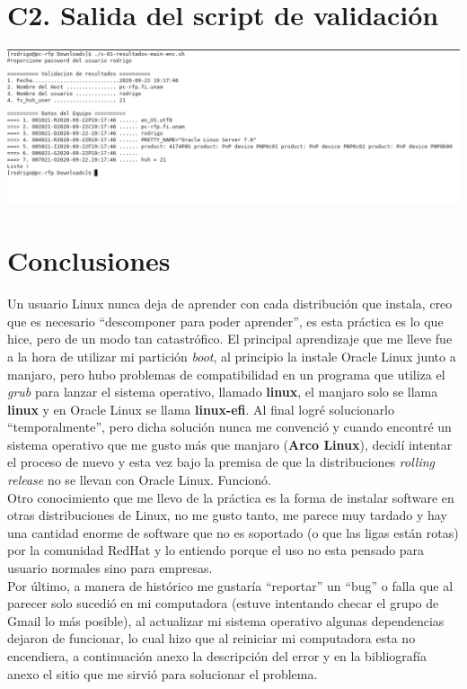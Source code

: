 \documentclass{article}
\begin{document}
\section*{C2. Salida del script de validación}

\begin{center}
    \includegraphics[width=\linewidth]{p01-validador.png}    
\end{center}

\section*{Conclusiones}
Un usuario Linux nunca deja de aprender con cada distribución que instala, 
creo que es necesario ``descomponer para poder aprender'', es esta práctica es 
lo que hice, pero de un modo tan catastrófico. El principal aprendizaje que me 
lleve fue a la hora de utilizar mi partición \textit{boot}, al principio la
instale Oracle Linux junto a manjaro, pero hubo problemas de compatibilidad 
en un programa que utiliza el \textit{grub} para lanzar el sistema operativo,
llamado \textbf{linux}, el manjaro solo se llama \textbf{linux} y en Oracle 
Linux se llama \textbf{linux-efi}. Al final logré solucionarlo 
``temporalmente'', pero dicha solución nunca me convenció y cuando encontré un 
sistema operativo que me gusto más que manjaro (\textbf{Arco Linux}), decidí
intentar el proceso de nuevo y esta vez bajo la premisa de que la distribuciones
\textit{rolling release} no se llevan con Oracle Linux. Funcionó.\\

Otro conocimiento que me llevo de la práctica es la forma de instalar software 
en otras distribuciones de Linux, no me gusto tanto, me parece muy tardado y 
hay una cantidad enorme de software que no es soportado (o que las ligas están
rotas) por la comunidad RedHat y lo entiendo porque el uso no esta pensado para
usuario normales sino para empresas.\\

Por último, a manera de histórico me gustaría ``reportar'' un ``bug'' o falla
que al parecer solo sucedió en mi computadora (estuve intentando checar
el grupo de Gmail lo más posible),  al actualizar mi sistema operativo algunas
dependencias dejaron de funcionar, lo cual hizo que al reiniciar mi computadora
esta no encendiera, a continuación anexo la descripción del error y en la 
bibliografía anexo el sitio que me sirvió para solucionar el problema.
\end{document}
